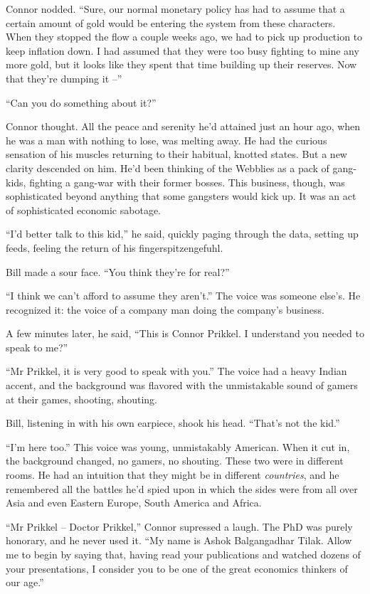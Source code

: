 Connor nodded. ``Sure, our normal monetary policy has had to assume
that a certain amount of gold would be entering the system from
these characters. When they stopped the flow a couple weeks ago, we
had to pick up production to keep inflation down. I had assumed
that they were too busy fighting to mine any more gold, but it
looks like they spent that time building up their reserves. Now
that they're dumping it --''

``Can you do something about it?''

Connor thought. All the peace and serenity he'd attained just an
hour ago, when he was a man with nothing to lose, was melting away.
He had the curious sensation of his muscles returning to their
habitual, knotted states. But a new clarity descended on him. He'd
been thinking of the Webblies as a pack of gang-kids, fighting a
gang-war with their former bosses. This business, though, was
sophisticated beyond anything that some gangsters would kick up. It
was an act of sophisticated economic sabotage.

``I'd better talk to this kid,'' he said, quickly paging through the
data, setting up feeds, feeling the return of his
fingerspitzengefuhl.

Bill made a sour face. ``You think they're for real?''

``I think we can't afford to assume they aren't.'' The voice was
someone else's. He recognized it: the voice of a company man doing
the company's business.

A few minutes later, he said, ``This is Connor Prikkel. I understand
you needed to speak to me?''

``Mr Prikkel, it is very good to speak with you.'' The voice had a
heavy Indian accent, and the background was flavored with the
unmistakable sound of gamers at their games, shooting, shouting.

Bill, listening in with his own earpiece, shook his head. ``That's
not the kid.''

``I'm here too.'' This voice was young, unmistakably American. When
it cut in, the background changed, no gamers, no shouting. These
two were in different rooms. He had an intuition that they might be
in different \emph{countries}, and he remembered all the battles
he'd spied upon in which the sides were from all over Asia and even
Eastern Europe, South America and Africa.

``Mr Prikkel -- Doctor Prikkel,'' Connor supressed a laugh. The PhD
was purely honorary, and he never used it. ``My name is Ashok
Balgangadhar Tilak. Allow me to begin by saying that, having read
your publications and watched dozens of your presentations, I
consider you to be one of the great economics thinkers of our
age.''


